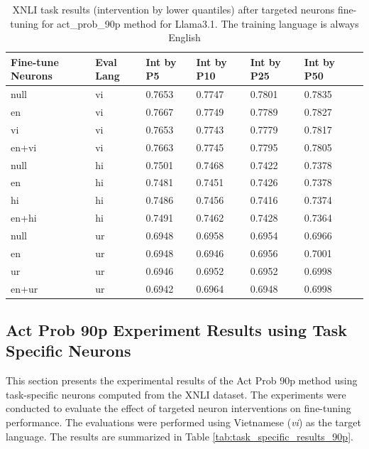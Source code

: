 \begin{table}[ht]
	\centering
	\renewcommand{\arraystretch}{1.3}
	\setlength{\tabcolsep}{4pt}
	\begin{tabularx}{\textwidth}{|X|X|X|X|X|X|X|}
		\hline
		\textbf{Fine-tune Neurons} & \textbf{Eval Lang} & \textbf{Int by P5} & \textbf{Int by P10} & \textbf{Int by P25} & \textbf{Int by P50} \\
		\hline
		null & vi & 0.7653 & 0.7747 & 0.7801 & 0.7835 \\
		en & vi & 0.7667 & 0.7749 & 0.7789 & 0.7827 \\
		vi & vi & 0.7653 & 0.7743 & 0.7779 & 0.7817 \\
		en+vi & vi & 0.7663 & 0.7745 & 0.7795 & 0.7805 \\
		\hline
		null & hi & 0.7501 & 0.7468 & 0.7422 & 0.7378 \\
		en & hi & 0.7481 & 0.7451 & 0.7426 & 0.7378 \\
		hi & hi & 0.7486 & 0.7456 & 0.7416 & 0.7374 \\
		en+hi & hi & 0.7491 & 0.7462 & 0.7428 & 0.7364 \\
		\hline
		null & ur & 0.6948 & 0.6958 & 0.6954 & 0.6966 \\
		en & ur & 0.6948 & 0.6946 & 0.6956 & 0.7001 \\
		ur & ur & 0.6946 & 0.6952 & 0.6952 & 0.6998 \\
		en+ur & ur & 0.6942 & 0.6964 & 0.6948 & 0.6998 \\
		\hline
	\end{tabularx}
	\caption{XNLI task results (intervention by lower quantiles) after targeted neurons fine-tuning for act\_prob\_90p method for Llama3.1. The training language is always English}
	\label{tab:xnli_results_lower_quantiles}
\end{table}

\subsection{Act Prob 90p Experiment Results using Task Specific Neurons}

This section presents the experimental results of the Act Prob 90p method using task-specific neurons computed from the XNLI dataset. The experiments were conducted to evaluate the effect of targeted neuron interventions on fine-tuning performance. The evaluations were performed using Vietnamese (\textit{vi}) as the target language. The results are summarized in Table \ref{tab:task_specific_results_90p}.

